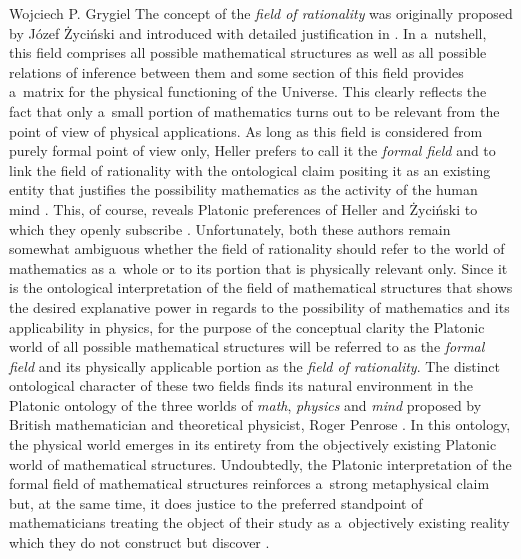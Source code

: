 \begin{artengenv}{Wojciech P. Grygiel}
The concept of the \textit{field of rationality} was originally proposed by Józef Życiński and introduced with detailed justification in 
\parencite[][]{zycinski_filozoficzne_1987}. %
 In a~nutshell, this field comprises all possible mathematical structures as well as all possible relations of inference between them and some section of this field provides a~matrix for the physical functioning of the Universe. This clearly reflects the fact that only a~small portion of mathematics turns out to be relevant from the point of view of physical applications. As long as this field is considered from purely formal point of view only, Heller prefers to call it the \textit{formal field} and to link the field of rationality with the ontological claim positing it as an existing entity that justifies the possibility mathematics as the activity of the human mind 
\parencite[][p.238]{heller_uchwycic_1997}. %
 This, of course, reveals Platonic preferences of Heller and Życiński to which they openly subscribe 
\parencite[e.g.,][]{zycinski_swiat_2013}. %
 Unfortunately, both these authors remain somewhat ambiguous whether the field of rationality should refer to the world of mathematics as a~whole or to its portion that is physically relevant only. Since it is the ontological interpretation of the field of mathematical structures that shows the desired explanative power in regards to the possibility of mathematics and its applicability in physics, for the purpose of the conceptual clarity the Platonic world of all possible mathematical structures will be referred to as the \textit{formal field} and its physically applicable portion as the \textit{field of rationality}. The distinct ontological character of these two fields finds its natural environment in the Platonic ontology of the three worlds of \textit{math}, \textit{physics} and \textit{mind} proposed by British mathematician and theoretical physicist, Roger Penrose 
\parencite[e.g.,][pp.17–21]{penrose_road_2004}. %
 In this ontology, the physical world emerges in its entirety from the objectively existing Platonic world of mathematical structures. Undoubtedly, the Platonic interpretation of the formal field of mathematical structures reinforces a~strong metaphysical claim but, at the same time, it does justice to the preferred standpoint of mathematicians treating the object of their study as a~objectively existing reality which they do not construct but discover 
\parencite[e.g.,][p.13]{penrose_road_2004}.%





\end{artengenv}
